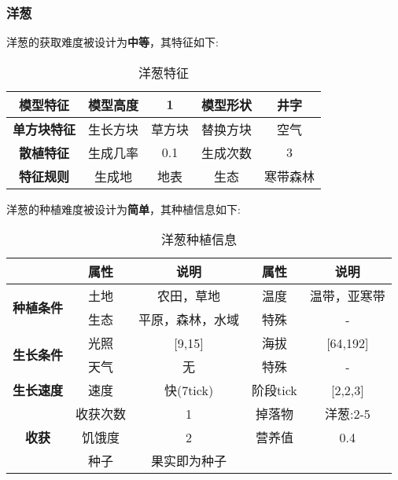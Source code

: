 \subsubsection{洋葱}

洋葱的获取难度被设计为\textbf{中等}，其特征如下:
\begin{table}[H]
    \centering
    \caption{洋葱特征}
    \label{table:洋葱特征}
    \setlength{\tabcolsep}{4mm}
    \begin{tabular}{c|cc|cc}
        \toprule
        \textbf{模型特征}   & 模型高度 & 1      & 模型形状 & 井字 \\
        \midrule
        \textbf{单方块特征} & 生长方块 & 草方块 & 替换方块 & 空气 \\
        \midrule
        \textbf{散植特征}   & 生成几率 & 0.1   & 生成次数 & 3    \\
        \midrule
        \textbf{特征规则}   & 生成地   & 地表   & 生态     & 寒带森林 \\
        \bottomrule
    \end{tabular}
\end{table}


洋葱的种植难度被设计为\textbf{简单}，其种植信息如下:

\begin{table}[H]
    \centering
    \caption{洋葱种植信息}
    \label{table:洋葱种植信息}
    \setlength{\tabcolsep}{4mm}
    \begin{tabular}{c|cc|cc}
        \toprule
                                           & \textbf{属性} & \textbf{说明}    & \textbf{属性} & \textbf{说明} \\
        \midrule
        \multirow{2}{*}{\textbf{种植条件}} & 土地          & 农田，草地       & 温度          & 温带，亚寒带    \\
                                           & 生态          & 平原，森林，水域 & 特殊          & -          \\
        \midrule
        \multirow{2}{*}{\textbf{生长条件}} & 光照          & [9,15]           & 海拔          & [64,192]      \\
                                           & 天气          & 无               & 特殊          & -             \\
        \midrule
        \textbf{生长速度}                  & 速度          & 快(7tick)     & 阶段tick      & [2,2,3]       \\
        \midrule
        \multirow{3}{*}{\textbf{收获}}     & 收获次数      & 1                & 掉落物        & 洋葱:2-5      \\
                                           & 饥饿度        & 2                & 营养值        & 0.4           \\
                                        & 种子 & 果实即为种子 \\
        \bottomrule
    \end{tabular}
\end{table}


